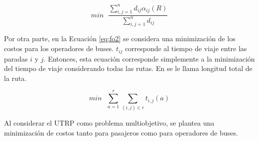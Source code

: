 \begin{equation}
\label{eq:fo1}
min\mbox{ }\frac{\sum^n_{i,j=1}d_{ij}\alpha_{ij}(R)}{\sum_{i,j=1}^{n}d_{ij}}
\end{equation} 

Por otra parte, en la Ecuación \eqref{eq:fo2} se considera una minimización de los costos para los operadores de buses. $t_{ij}$ corresponde al tiempo de viaje entre las paradas $i$ y $j$. Entonces, esta ecuación corresponde simplemente a la minimización del tiempo de viaje considerando todas las rutas. En \cite{NewHaEOps} se le llama longitud total de la ruta.

\begin{equation}
\label{eq:fo2}
min\mbox{ }\sum^r_{a=1}\sum_{(i,j) \in r} t_{i,j} (a)
\end{equation} 

Al considerar el UTRP como problema multiobjetivo, se plantea una minimización de costos tanto para pasajeros como para operadores de buses.
